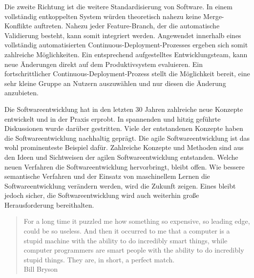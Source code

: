 Die zweite Richtung ist die weitere Standardisierung von Software. In einem vollständig entkoppelten System würden theoretisch nahezu keine Merge-Konflikte auftreten. Nahezu jeder Feature-Branch, der die automatische Validierung besteht, kann somit integriert werden. Angewendet innerhalb eines vollständig automatisierten Continuous-Deployment-Prozesses ergeben sich somit zahlreiche Möglichkeiten. Ein entsprechend aufgestelltes Entwicklungsteam, kann neue Änderungen direkt auf dem Produktivsystem evaluieren. Ein fortschrittlicher Continuous-Deployment-Prozess stellt die Möglichkeit bereit, eine sehr kleine Gruppe an Nutzern auszuwählen und nur diesen die Änderung anzubieten.

Die Softwareentwicklung hat in den letzten 30 Jahren zahlreiche neue Konzepte entwickelt und in der Praxis erprobt. In spannenden und hitzig geführte Diskussionen wurde darüber gestritten. Viele der entstandenen Konzepte haben die Softwareentwicklung nachhaltig geprägt. Die agile Softwareentwicklung ist das wohl prominenteste Beispiel dafür. Zahlreiche Konzepte und Methoden sind aus den Ideen und Sichtweisen der agilen Softwareentwicklung entstanden. Welche neuen Verfahren die Softwareentwicklung hervorbringt, bleibt offen. Wie bessere semantische Verfahren und der Einsatz von maschinellem Lernen die Softwareentwicklung verändern werden, wird die Zukunft zeigen. Eines bleibt jedoch sicher, die Softwareentwicklung wird auch weiterhin große Herausforderung bereithalten.

\blockquote {\centering For a long time it puzzled me how something so expensive, so leading edge, could be so useless. And then it occurred to me that a computer is a stupid machine with the ability to do incredibly smart things, while computer programmers are smart people with the ability to do incredibly stupid things. They are, in short, a perfect match. \\ Bill Bryson}
